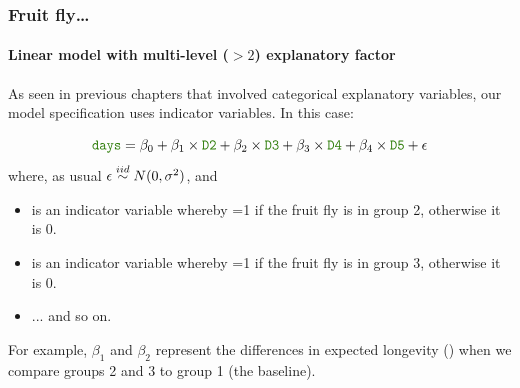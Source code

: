 \documentclass{beamer}\usepackage[]{graphicx}\usepackage[]{xcolor}
\begin{document}
\begin{frame}[fragile, label={cnrpt_model}]
\frametitle{Fruit fly\ldots}
\framesubtitle{Linear  model with multi-level ($>2$) explanatory factor}

As seen in previous chapters that involved categorical explanatory variables, our model specification uses indicator variables. In this case:

\[\rcode{days}=\beta_0+\beta_{1}\times\rcode{D2} +\beta_{2}\times\rcode{D3} + \beta_{3}\times\rcode{D4}+  \beta_{4}\times\rcode{D5} + \epsilon\]
where, as usual $\epsilon \stackrel{iid}{\sim} N(0, \sigma^2)$, and

\medskip
\begin{itemize}
\item {} is an indicator variable whereby =1 if the fruit fly is in group 2, otherwise it is 0.

\item {} is an indicator variable whereby =1 if the fruit fly is in group 3, otherwise it is 0.

\item ... and so on.
\end{itemize}

For example, $\beta_{1}$ and $\beta_{2}$ represent the differences in expected longevity () when we compare groups 2 and 3 to group 1 (the baseline).

\end{frame}
\end{document}

